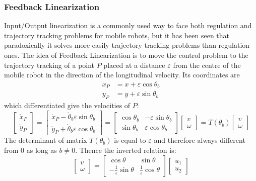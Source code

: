\subsubsection{Feedback Linearization}
Input/Output linearization is a commonly used way to face both regulation and trajectory tracking problems for mobile robots, but it has been seen that paradoxically it solves more easily trajectory tracking problems than regulation ones.
The idea of Feedback Linearization is to move the control problem to the trajectory tracking of a point $P$ placed at a distance $\varepsilon$ from the centre of the mobile robot in the direction of the longitudinal velocity.
Its coordinates are
\begin{equation}
	\begin{split}
		x_P&=x+\varepsilon\cos\theta_b\\
		y_P&=y+\varepsilon\sin\theta_b
	\end{split}
\end{equation}
which differentiated give the velocities of $P$:
\begin{equation}
	\left[\begin{matrix}
		\dot{x}_P\\\dot{y}_P
	\end{matrix}\right]=\left[\begin{matrix}
		\dot{x}_P-\dot{\theta}_b\varepsilon\sin\theta_b\\
		\dot{y}_P+\dot{\theta}_b\varepsilon\cos\theta_b
	\end{matrix}\right]=\left[\begin{matrix}
	\cos\theta_b & -\varepsilon\sin\theta_b\\
	\sin\theta_b & \varepsilon\cos\theta_b
	\end{matrix}\right]\left[\begin{matrix}
	v\\\omega\end{matrix}\right]=T(\theta_b)\left[\begin{matrix}
	v\\\omega\end{matrix}\right]
\end{equation}
The determinant of matrix $T(\theta_b)$ is equal to $\varepsilon$ and therefore always different from $0$ as long as $b\neq0$. Thence the inverted relation is:
\begin{equation} 
	\left[\begin{matrix}
		v\\\omega\end{matrix}\right]
	=\left[\begin{matrix}
		\cos\theta & \sin\theta\\
			-\frac{1}{\varepsilon}\sin\theta & \frac{1}{\varepsilon}\cos\theta
	\end{matrix}\right]\left[\begin{matrix}
		u_1\\u_2
	\end{matrix}\right] 
\end{equation}
